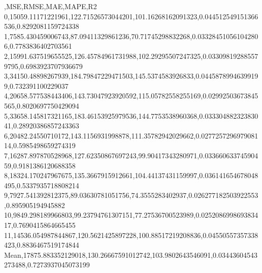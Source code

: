 ,MSE,RMSE,MAE,MAPE,R2
0,15059.11171221961,122.71526573044201,101.16268162091323,0.044512549151366536,0.8292081159724338
1,7585.430459006743,87.09411329861236,70.71745298832268,0.033284510561042806,0.7783836402703561
2,15991.637519655525,126.45784961731988,102.29295507247325,0.033098192885579795,0.6983923707936679
3,34150.48898267939,184.79847229471503,145.5374583926833,0.04458789946399199,0.732391100229037
4,20658.577538443406,143.73047923920592,115.05782558255169,0.02992503673845565,0.8020697750429094
5,33658.145817321165,183.46153925979536,144.7753538960368,0.03330488232383041,0.28920386857243363
6,20482.24550710172,143.1156931998878,111.35782942029662,0.027725729697908114,0.5985498659274319
7,16287.897870528968,127.62350867697243,99.90417343280971,0.03366063374590459,0.9181386120688358
8,18324.170247967675,135.3667915912661,104.44137431159997,0.036141654678048495,0.5337935718808214
9,7927.541392812375,89.03630781051756,74.3555283402937,0.026277182503922553,0.895905194945882
10,9849.298189966803,99.23794761307151,77.27536700523989,0.025208699869383417,0.7690415864665455
11,14536.054987844867,120.5621425897228,100.88517219208836,0.04550557357338423,0.8836467519174844
Mean,17875.883352129018,130.26667591012742,103.9802643546091,0.03443604543273488,0.7273937045073199
